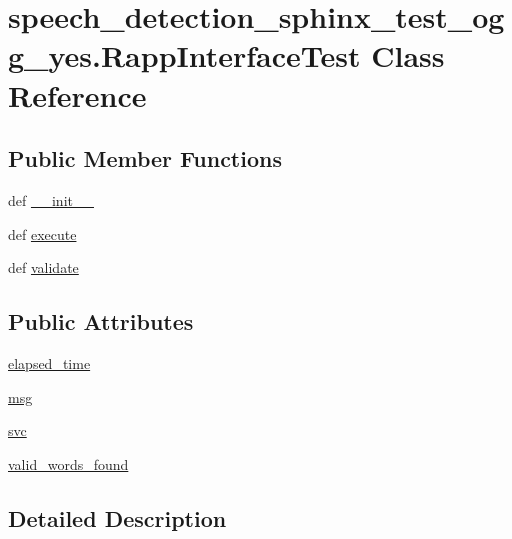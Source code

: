 \hypertarget{classspeech__detection__sphinx__test__ogg__yes_1_1RappInterfaceTest}{\section{speech\-\_\-detection\-\_\-sphinx\-\_\-test\-\_\-ogg\-\_\-yes.\-Rapp\-Interface\-Test Class Reference}
\label{classspeech__detection__sphinx__test__ogg__yes_1_1RappInterfaceTest}
}
\subsection*{Public Member Functions}
\begin{DoxyCompactItemize}
\item 
def \hyperlink{classspeech__detection__sphinx__test__ogg__yes_1_1RappInterfaceTest_a90e1bea7d4a43deb08e29910769e27e5}{\-\_\-\-\_\-init\-\_\-\-\_\-}
\item 
def \hyperlink{classspeech__detection__sphinx__test__ogg__yes_1_1RappInterfaceTest_a8dc6f0b6bdc3a8ec73a2db1425bb00d7}{execute}
\item 
def \hyperlink{classspeech__detection__sphinx__test__ogg__yes_1_1RappInterfaceTest_ad3cb13a05d4d8dd05e4884dedc36bb23}{validate}
\end{DoxyCompactItemize}
\subsection*{Public Attributes}
\begin{DoxyCompactItemize}
\item 
\hyperlink{classspeech__detection__sphinx__test__ogg__yes_1_1RappInterfaceTest_abe6d54c2afc9977193696591f44cbe35}{elapsed\-\_\-time}
\item 
\hyperlink{classspeech__detection__sphinx__test__ogg__yes_1_1RappInterfaceTest_a0881172091dca700e14c8713554e541d}{msg}
\item 
\hyperlink{classspeech__detection__sphinx__test__ogg__yes_1_1RappInterfaceTest_ac10ffe01f25b26ec9d6109fa02ec7a06}{svc}
\item 
\hyperlink{classspeech__detection__sphinx__test__ogg__yes_1_1RappInterfaceTest_a26665541d84685e574316fbdcd079d5c}{valid\-\_\-words\-\_\-found}
\end{DoxyCompactItemize}


\subsection{Detailed Description}


